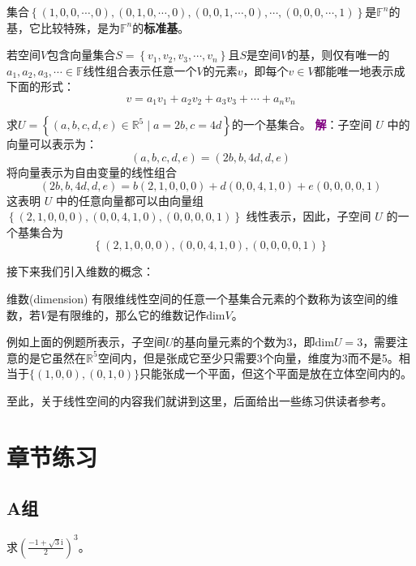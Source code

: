 集合$\left\{ (1,0,0,\cdots,0),(0,1,0,\cdots,0),(0,0,1,\cdots,0),\cdots,(0,0,0,\cdots,1) \right\}$是$\mathbb{F}^n$的基，它比较特殊，是为$\mathbb{F}^n$的\textbf{标准基}。

\begin{corollary}
	若空间$V$包含向量集合$S=\left\{ v_1,v_2,v_3,\cdots,v_n \right\}$且$S$是空间$V$的基，则仅有唯一的$a_1,a_2,a_3,\cdots \in \mathbb{F}$线性组合表示任意一个$V$的元素$v$，即每个$v\in V$都能唯一地表示成下面的形式：$$v=a_1v_1+a_2v_2+a_3v_3+\cdots+a_nv_n$$
\end{corollary}

\begin{example}
	求$U=\left\{ (a,b,c,d,e)\in \mathbb{R}^5 \mid a=2b,c=4d \right\}$的一个基集合。
	\tcblower
	\textcolor{purple}{\textbf{解}}：子空间 $ U $ 中的向量可以表示为：$$(a, b, c, d, e) = (2b, b, 4d, d, e)$$将向量表示为自由变量的线性组合$$(2b, b, 4d, d, e) = b(2, 1, 0, 0, 0) + d(0, 0, 4, 1, 0) + e(0, 0, 0, 0, 1)$$这表明 $ U $ 中的任意向量都可以由向量组 $ \left\{ (2, 1, 0, 0, 0), (0, 0, 4, 1, 0), (0, 0, 0, 0, 1) \right\} $ 线性表示，因此，子空间 $ U $ 的一个基集合为$$\left\{ (2,1,0,0,0), (0,0,4,1,0), (0,0,0,0,1) \right\}$$
\end{example}

接下来我们引入维数的概念：

\begin{definition}{维数(dimension)}
	有限维线性空间的任意一个基集合元素的个数称为该空间的维数，若$V$是有限维的，那么它的维数记作$\text{dim} V$。
\end{definition}

例如上面的例题所表示，子空间$U$的基向量元素的个数为3，即$\text{dim} U=3$，需要注意的是它虽然在$\mathbb{R}^5$空间内，但是张成它至少只需要3个向量，维度为3而不是5。相当于$\{(1,0,0),(0,1,0)\}$只能张成一个平面，但这个平面是放在立体空间内的。

至此，关于线性空间的内容我们就讲到这里，后面给出一些练习供读者参考。

\section{章节练习}

\subsection{A组}

\begin{reidai}
	求$\displaystyle \left( \frac{-1+\sqrt{3}\mathrm{i}}{2} \right)^3$。
\end{reidai}

